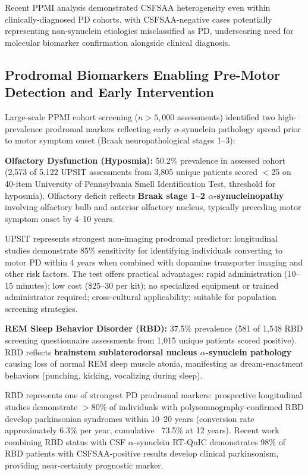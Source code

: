 \documentclass[11pt]{article}
\begin{document}
Recent PPMI analysis\cite{siderowf2023csf} demonstrated CSFSAA heterogeneity even within clinically-diagnosed PD cohorts, with CSFSAA-negative cases potentially representing non-synuclein etiologies misclassified as PD, underscoring need for molecular biomarker confirmation alongside clinical diagnosis.

\subsection{Prodromal Biomarkers Enabling Pre-Motor Detection and Early Intervention}

Large-scale PPMI cohort screening ($n>5,000$ assessments) identified two high-prevalence prodromal markers reflecting early $\alpha$-synuclein pathology spread prior to motor symptom onset (Braak neuropathological stages 1--3)\cite{braak2003staging,mahlknecht2022prodromal}:

\textbf{Olfactory Dysfunction (Hyposmia):} 50.2\% prevalence in assessed cohort (2,573 of 5,122 UPSIT assessments from 3,805 unique patients scored $<$25 on 40-item University of Pennsylvania Smell Identification Test\cite{doty1984smell}, threshold for hyposmia). Olfactory deficit reflects \textbf{Braak stage 1--2 $\alpha$-synucleinopathy} involving olfactory bulb and anterior olfactory nucleus, typically preceding motor symptom onset by 4--10 years\cite{braak2003staging}. 

UPSIT represents strongest non-imaging prodromal predictor: longitudinal studies demonstrate 85\% sensitivity for identifying individuals converting to motor PD within 4 years when combined with dopamine transporter imaging and other risk factors\cite{jennings2017conversion}. The test offers practical advantages: rapid administration (10--15 minutes); low cost (\$25--30 per kit); no specialized equipment or trained administrator required; cross-cultural applicability; suitable for population screening strategies.

\textbf{REM Sleep Behavior Disorder (RBD):} 37.5\% prevalence (581 of 1,548 RBD screening questionnaire assessments from 1,015 unique patients scored positive). RBD reflects \textbf{brainstem sublaterodorsal nucleus $\alpha$-synuclein pathology} causing loss of normal REM sleep muscle atonia, manifesting as dream-enactment behaviors (punching, kicking, vocalizing during sleep)\cite{schenck2013rbd}.

RBD represents one of strongest PD prodromal markers: prospective longitudinal studies demonstrate $>$80\% of individuals with polysomnography-confirmed RBD develop parkinsonian syndromes within 10--20 years (conversion rate approximately 6.3\% per year, cumulative ~73.5\% at 12 years)\cite{postuma2019rbd}. Recent work combining RBD status with CSF $\alpha$-synuclein RT-QuIC demonstrates 98\% of RBD patients with CSFSAA-positive results develop clinical parkinsonism\cite{iranzo2021rbd}, providing near-certainty prognostic marker.
\end{document}
